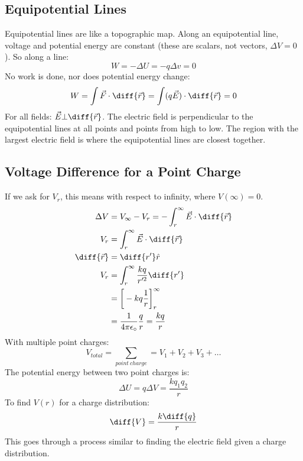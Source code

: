 \documentclass{math}
\begin{document}
\subsection*{Equipotential Lines}
Equipotential lines are like a topographic map. Along an equipotential line,
voltage and potential energy are constant (these are scalars, not vectors,
\( \Delta V = 0 \)). So along a line:
\[ W = -\Delta U = -q\Delta v = 0 \]
No work is done, nor does potential energy change:
\[ W = \int\vec{F}\cdot\diff{\vec{r}} = \int(q\vec{E})\cdot\diff{\vec{r}} = 0 \]
For all fields: \( \vec{E}\bot\diff{\vec{r}} \). The electric field is
perpendicular to the equipotential lines at all points and points from high to
low. The region with the largest electric field is where the equipotential
lines are closest together.

\subsection*{Voltage Difference for a Point Charge}
If we ask for \( V_r \), this means with respect to infinity, where \( V(\infty)
= 0 \).
\begin{align*}
  \Delta V &= V_{\infty}-V_r = -\int_{r}^{\infty}\vec{E}\cdot\diff{\vec{r}} \\
  V_r &= \int_{r}^{\infty}\vec{E}\cdot\diff{\vec{r}} \\
  \diff{\vec{r}} &= \diff{r'}\hat{r} \\
  V_r &= \int_{r}^{\infty}\frac{kq}{r'^2}\diff{r'} \\
  &= \bigg[-kq\frac{1}{r}\bigg]_{r}^{\infty} \\
  &= \frac{1}{4\pi\epsilon_{\circ}}\frac{q}{r} = \frac{kq}{r}
\end{align*}
With multiple point charges:
\[ V_{total} = \sum_{point~charge} = V_1+V_2+V_3+\dots \]
The potential energy between two point charges is:
\[ \Delta U = q\Delta V = \frac{kq_1q_2}{r} \]
To find \( V(r) \) for a charge distribution:
\[ \diff{V} = \frac{k\diff{q}}{r} \]
This goes through a process similar to finding the electric field given a charge
distribution.
\end{document}
